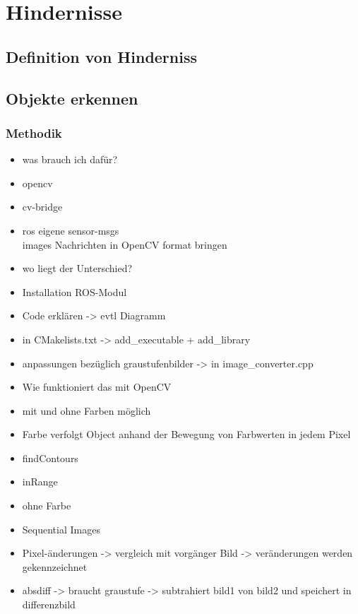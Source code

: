
	\chapter{Hindernisse}
		\section{Definition von Hinderniss}
		
		
		
		\section{Objekte erkennen}
					
			\subsection{Methodik}
				\begin{itemize}
				\item was brauch ich dafür?
				\item opencv
				\item cv-bridge
				\item ros eigene sensor-msgs\\images Nachrichten in OpenCV format bringen
				\item wo liegt der Unterschied?
				\item Installation ROS-Modul
				\item Code erklären -> evtl Diagramm
				\item in CMakelists.txt -> add\_executable + add\_library
				\item anpassungen bezüglich graustufenbilder -> in image\_converter.cpp
				\end{itemize}
				
				\begin{itemize}
				\item Wie funktioniert das mit OpenCV
				\item mit und ohne Farben möglich
				\item Farbe verfolgt Object anhand der Bewegung von Farbwerten in jedem Pixel
				\item findContours
				\item inRange
				\item ohne Farbe
				\item Sequential Images
				\item Pixel-änderungen -> vergleich mit vorgänger Bild -> veränderungen werden gekennzeichnet
				\item absdiff -> braucht graustufe -> subtrahiert bild1 von bild2 und speichert in differenzbild
				
				\end{itemize}

